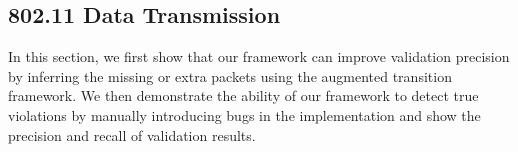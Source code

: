 \subsection{802.11 Data Transmission}
\label{subsec:tx}

In this section, we first show that our
framework can improve validation precision by inferring
the missing or extra packets using the augmented transition
framework. We then demonstrate the ability of our framework to detect true violations by
manually introducing bugs in the \ns{} implementation and show the precision and
recall of validation results.

